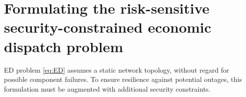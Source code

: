 
\section{Formulating the risk-sensitive security-constrained economic dispatch problem}
\label{sec:rsced}


ED problem \eqref{eq:ED} assumes a static network topology, without regard for possible component failures. To ensure resilience against potential outages, this formulation must be augmented with additional security constraints. 

